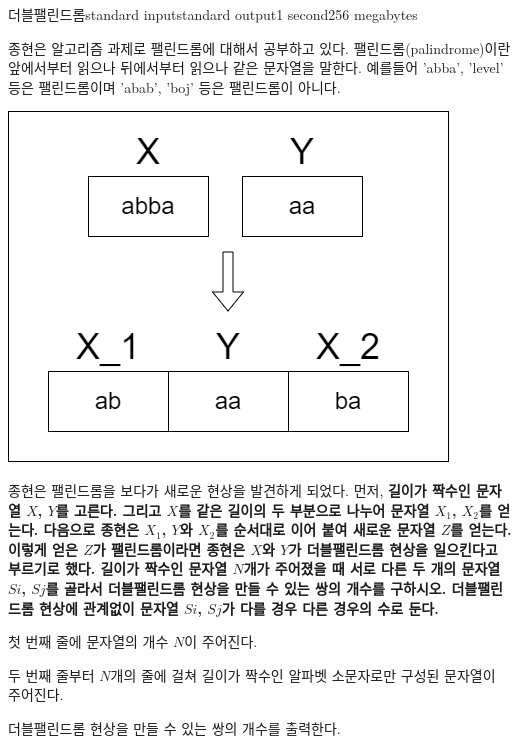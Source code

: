 \begin{problem}{더블팰린드롬}{standard input}{standard output}{1 second}{256 megabytes}

종현은 알고리즘 과제로 팰린드롬에 대해서 공부하고 있다. 팰린드롬(palindrome)이란 앞에서부터 읽으나 뒤에서부터 읽으나 같은 문자열을 말한다. 예를들어 'abba', 'level' 등은 팰린드롬이며 'abab', 'boj' 등은 팰린드롬이 아니다. 

\begin{center}
\includegraphics[bb=0 0 100 200]{draw.png}
\end{center}

종현은 팰린드롬을 보다가 새로운 현상을 발견하게 되었다. 먼저, \bf{길이가 짝수}인 문자열 $X$, $Y$를 고른다. 그리고 $X$를 같은 길이의 두 부분으로 나누어 문자열 $X_1$, $X_2$를 얻는다. 다음으로 종현은 $X_1$, $Y$와 $X_2$를 순서대로 이어 붙여 새로운 문자열 $Z$를 얻는다. 이렇게 얻은 $Z$가 팰린드롬이라면 종현은 $X$와 $Y$가 더블팰린드롬 현상을 일으킨다고 부르기로 했다. 길이가 짝수인 문자열 $N$개가 주어졌을 때 서로 다른 두 개의 문자열 $S{i}$, $S{j}$를 골라서 더블팰린드롬 현상을 만들 수 있는 쌍의 개수를 구하시오. 더블팰린드롬 현상에 관계없이 문자열 $S{i}$, $S{j}$가 다를 경우 다른 경우의 수로 둔다. 

\InputFile
첫 번째 줄에 문자열의 개수 $N$이 주어진다.

두 번째 줄부터 $N$개의 줄에 걸쳐 길이가 짝수인 알파벳 소문자로만 구성된 문자열이 주어진다.

\OutputFile
더블팰린드롬 현상을 만들 수 있는 쌍의 개수를 출력한다.

\Example

\begin{example}
%
\end{example}


\end{problem}
